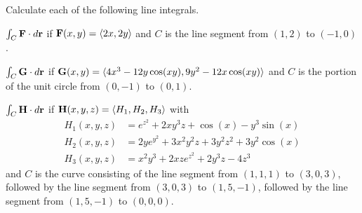 \begin{activity} \label{A:12.4.2}  
Calculate each of the following line integrals.
\ba
\item $\int_C \mathbf{F}\cdot d\mathbf{r}$ if $\mathbf{F}(x,y) = \langle 2x,2y\rangle$
  and $C$ is the line segment from $(1,2)$ to $(-1,0)$.
\item $\int_C \mathbf{G}\cdot d\mathbf{r}$ if $\mathbf{G}(x,y) = \langle 4x^3-12y\cos(xy),9y^2-12x\cos(xy)\rangle$
  and $C$ is the portion of the unit circle from $(0,-1)$ to $(0,1)$.
\item $\int_C \mathbf{H}\cdot d\mathbf{r}$ if $\mathbf{H}(x,y,z) = \langle
  H_1,H_2,H_3\rangle$ with
  \begin{align*}
    H_1(x,y,z) &= e^{z^2}+2xy^3z+\cos(x)-y^3\sin(x)\\
    H_2(x,y,z) &= 2ye^{y^2}+3x^2y^2z+3y^2z^2+3y^2\cos(x)\\
    H_3(x,y,z) &= x^2y^3+2xze^{z^2}+2y^3z-4z^3
  \end{align*}
  and $C$ is the curve consisting of the line segment from $(1,1,1)$
  to $(3,0,3)$, followed by the line segment from $(3,0,3)$ to
  $(1,5,-1)$, followed by the line segment from $(1,5,-1)$ to $(0,0,0)$.
\ea
\end{activity}
\begin{smallhint}

\end{smallhint}
\begin{bighint}

\end{bighint}
\begin{activitySolution}

\end{activitySolution}
\aftera
